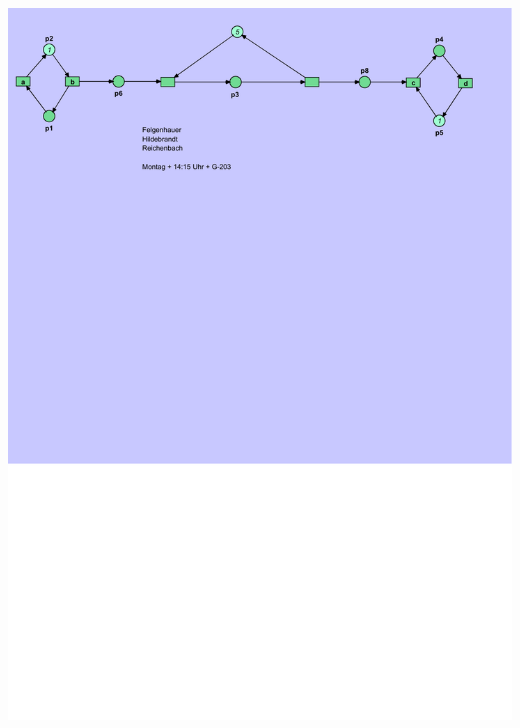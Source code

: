 \documentclass[12pt,a4paper]{../krautsourcing/homework}
\begin{document}
\includegraphics[scale=0.8,trim={0mm 225mm 10mm 0cm},clip]{Aufgabe_6-4/Aufgabe_6-4-7-sim-2.pdf}
\end{document}

